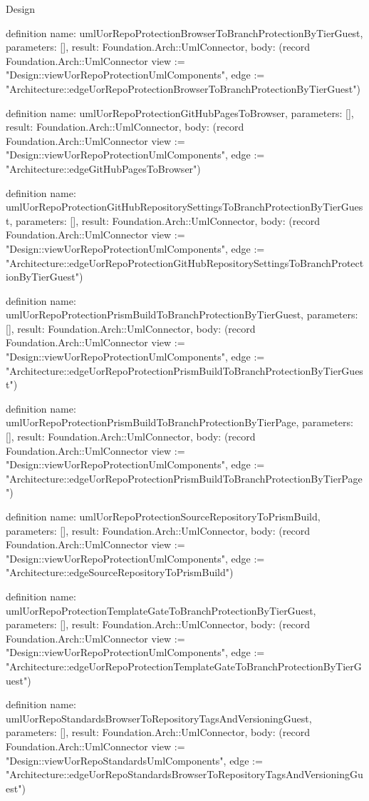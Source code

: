 \begin{lexlean}{Design}
\begin{semanticmodule}
definition{
  name: umlUorRepoProtectionBrowserToBranchProtectionByTierGuest,
  parameters: [],
  result: Foundation.Arch::UmlConnector,
  body: (record Foundation.Arch::UmlConnector {view := "Design::viewUorRepoProtectionUmlComponents", edge := "Architecture::edgeUorRepoProtectionBrowserToBranchProtectionByTierGuest"})
}

definition{
  name: umlUorRepoProtectionGitHubPagesToBrowser,
  parameters: [],
  result: Foundation.Arch::UmlConnector,
  body: (record Foundation.Arch::UmlConnector {view := "Design::viewUorRepoProtectionUmlComponents", edge := "Architecture::edgeGitHubPagesToBrowser"})
}

definition{
  name: umlUorRepoProtectionGitHubRepositorySettingsToBranchProtectionByTierGuest,
  parameters: [],
  result: Foundation.Arch::UmlConnector,
  body: (record Foundation.Arch::UmlConnector {view := "Design::viewUorRepoProtectionUmlComponents", edge := "Architecture::edgeUorRepoProtectionGitHubRepositorySettingsToBranchProtectionByTierGuest"})
}

definition{
  name: umlUorRepoProtectionPrismBuildToBranchProtectionByTierGuest,
  parameters: [],
  result: Foundation.Arch::UmlConnector,
  body: (record Foundation.Arch::UmlConnector {view := "Design::viewUorRepoProtectionUmlComponents", edge := "Architecture::edgeUorRepoProtectionPrismBuildToBranchProtectionByTierGuest"})
}

definition{
  name: umlUorRepoProtectionPrismBuildToBranchProtectionByTierPage,
  parameters: [],
  result: Foundation.Arch::UmlConnector,
  body: (record Foundation.Arch::UmlConnector {view := "Design::viewUorRepoProtectionUmlComponents", edge := "Architecture::edgeUorRepoProtectionPrismBuildToBranchProtectionByTierPage"})
}

definition{
  name: umlUorRepoProtectionSourceRepositoryToPrismBuild,
  parameters: [],
  result: Foundation.Arch::UmlConnector,
  body: (record Foundation.Arch::UmlConnector {view := "Design::viewUorRepoProtectionUmlComponents", edge := "Architecture::edgeSourceRepositoryToPrismBuild"})
}

definition{
  name: umlUorRepoProtectionTemplateGateToBranchProtectionByTierGuest,
  parameters: [],
  result: Foundation.Arch::UmlConnector,
  body: (record Foundation.Arch::UmlConnector {view := "Design::viewUorRepoProtectionUmlComponents", edge := "Architecture::edgeUorRepoProtectionTemplateGateToBranchProtectionByTierGuest"})
}

definition{
  name: umlUorRepoStandardsBrowserToRepositoryTagsAndVersioningGuest,
  parameters: [],
  result: Foundation.Arch::UmlConnector,
  body: (record Foundation.Arch::UmlConnector {view := "Design::viewUorRepoStandardsUmlComponents", edge := "Architecture::edgeUorRepoStandardsBrowserToRepositoryTagsAndVersioningGuest"})
}


\end{semanticmodule}
\end{lexlean}
